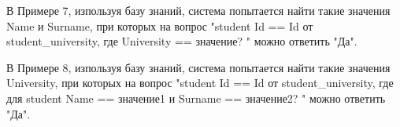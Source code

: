 \documentclass[12pt, a4paper]{extarticle}
\begin{document}
\begin{figure}[h!]
	\begin{minipage}[h]{0.31\linewidth}
	\end{minipage}
	\hfill
	\begin{minipage}[h]{0.31\linewidth}
	\end{minipage}
	\hfill
	\begin{minipage}[h]{0.31\linewidth}
	\end{minipage}
\end{figure}\par
В Примере 7, изпользуя базу знаний, система попытается найти такие значения Name и Surname, при которых на вопрос "student Id == Id от student\_university, где University == значение? " можно ответить "Да".\par
В Примере 8, изпользуя базу знаний, система попытается найти такие значения University, при которых на вопрос "student Id == Id от student\_university, где для student Name == значение1 и Surname == значение2? " можно ответить "Да".\par
\end{document}
